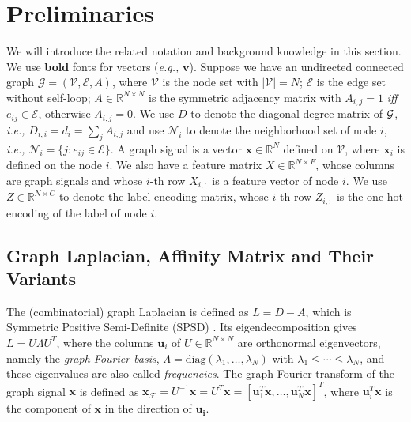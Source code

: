 \documentclass{article}
\newcommand\ie{\textit{i.e.,}}
\newcommand\eg{\textit{e.g.,}}
\newcommand{\diag}{\mathrm{diag}}
\newcommand{\Rbb}{{\mathbb{R}}}
\renewcommand{\u}{\boldsymbol{u}}
\newcommand{\x}{{\boldsymbol{x}}}
\newcommand{\0}{{\boldsymbol{0}}}
\newcommand{\6}{{\partial}}
\newcommand{\8}{{\infty}}
\newcommand{\4}{{\nabla}}
\providecommand{\abs}[1]{\left| #1 \right|}
\begin{document}
\section{Preliminaries}
\label{sec:prelimiary_notation}
We will introduce the related notation and background knowledge in this section. We use \textbf{bold} fonts for vectors (\eg{} $\bm{v}$). Suppose we have an undirected connected graph $\mathcal{G}=(\mathcal{V},\mathcal{E}, A)$, where $\mathcal{V}$ is the node set with $\abs{\mathcal{V}}=N$; $\mathcal{E}$ is the edge set without self-loop; $A \in \mathbb{R}^{N\times N}$ is the symmetric adjacency matrix with $A_{i,j}=1$ \textit{iff} $e_{ij} \in \mathcal{E}$, otherwise $A_{i,j}=0$.
We use $D$ to denote the diagonal degree matrix of ${\cal G}$, \ie{} $D_{i,i} = d_i = \sum_j A_{i,j}$ and 
use $\mathcal{N}_i$ to denote the neighborhood set of node $i$, \ie{}  $\mathcal{N}_i=\{j: e_{ij} \in \mathcal{E}\}$. A graph signal is a vector $\bm{x} \in \mathbb{R}^N$ defined on $\mathcal{V}$, where $\bm{x}_i$ is defined on the node $i$. We also have a feature matrix ${X} \in \mathbb{R}^{N\times F}$, whose columns are graph signals and whose $i$-th row  ${X_{i,:}}$ is a feature vector of node $i$. We use $Z\in \mathbb{R}^{N\times C}$ to denote the label encoding matrix, whose $i$-th row  $Z_{i,:}$ is the one-hot encoding of the label of node $i$. 

\subsection{Graph Laplacian, Affinity Matrix and Their Variants} 
\label{sec:laplacian_affinity_matrix}
The (combinatorial) graph Laplacian is defined as $L = D - A$, which is Symmetric Positive Semi-Definite (SPSD)  \cite{chung1997spectral}. Its eigendecomposition gives $L=U\Lambda U^T$, where the columns $\u_i$ of $U\in \Rbb^{N\times N}$ are orthonormal eigenvectors, namely the \textit{graph Fourier basis}, $\Lambda = \diag(\lambda_1, \ldots, \lambda_N)$ with $\lambda_1 \leq \cdots \leq \lambda_N$, and these eigenvalues are also called \textit{frequencies}. The graph Fourier transform of the graph signal $\x$ is defined as $\bm{x}_\mathcal{F} = U^{-1} \bm{x} = U^{T} \bm{x} = [\u_1^T\x, \ldots, \u_N^T\x]^T$, where $\bm{u}_i^T \bm{x}$ is the component of $\bm{x}$ in the direction of $\bm{u_i}$. 
\end{document}

